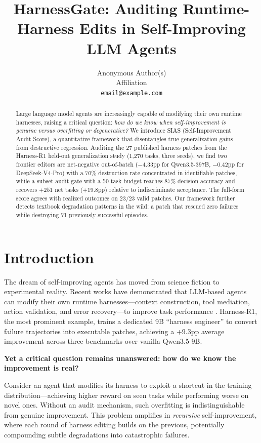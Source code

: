 \documentclass{article}
\title{HarnessGate: Auditing Runtime-Harness Edits in Self-Improving LLM Agents}
\author{
  Anonymous Author(s) \\
  Affiliation \\
  \texttt{email@example.com}
}
\begin{document}
\maketitle

\begin{abstract}
Large language model agents are increasingly capable of modifying their own runtime harnesses, raising a critical question: \emph{how do we know when self-improvement is genuine versus overfitting or degenerative?} We introduce SIAS (Self-Improvement Audit Score), a quantitative framework that disentangles true generalization gains from destructive regression. Auditing the 27 published harness patches from the Harness-R1 held-out generalization study (1{,}270 tasks, three seeds), we find two frontier editors are net-negative out-of-batch ($-4.33$pp for Qwen3.5-397B, $-0.42$pp for DeepSeek-V4-Pro) with a 70\% destruction rate concentrated in identifiable patches, while a subset-audit gate with a 50-task budget reaches 87\% decision accuracy and recovers $+251$ net tasks ($+19.8$pp) relative to indiscriminate acceptance. The full-form score agrees with realized outcomes on 23/23 valid patches. Our framework further detects textbook degradation patterns in the wild: a patch that rescued zero failures while destroying 71 previously successful episodes.
\end{abstract}

\section{Introduction}
\label{sec:intro}

The dream of self-improving agents has moved from science fiction to experimental reality. Recent works have demonstrated that LLM-based agents can modify their own runtime harnesses---context construction, tool mediation, action validation, and error recovery---to improve task performance \citep{shao2026harnessr1, primeintellect2026primeagent}. Harness-R1, the most prominent example, trains a dedicated 9B ``harness engineer'' to convert failure trajectories into executable patches, achieving a +9.3pp average improvement across three benchmarks over vanilla Qwen3.5-9B.

\textbf{Yet a critical question remains unanswered: how do we know the improvement is real?}

Consider an agent that modifies its harness to exploit a shortcut in the training distribution---achieving higher reward on seen tasks while performing worse on novel ones. Without an audit mechanism, such overfitting is indistinguishable from genuine improvement. This problem amplifies in \emph{recursive} self-improvement, where each round of harness editing builds on the previous, potentially compounding subtle degradations into catastrophic failures.
\end{document}
